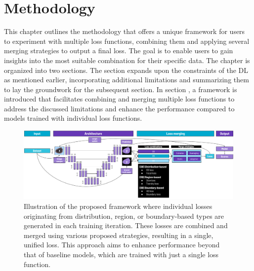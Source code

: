 \chapter{Methodology}
\label{chap:methodology}
This chapter outlines the methodology that offers a unique framework for users to experiment with multiple loss functions, combining them and applying several merging strategies to output a final loss. The goal is to enable users to gain insights into the most suitable combination for their specific data. The chapter is organized into two sections. The  section expands upon the constraints of the \acf{DL} as mentioned earlier, incorporating additional limitations and summarizing them to lay the groundwork for the subsequent section. In section , a framework is introduced that facilitates combining and merging multiple loss functions to address the discussed limitations and enhance the performance compared to models trained with individual loss functions.

\begin{figure}[H]%
  \centering
  \includegraphics[width=\imgWidthXL]{images/Pipeline_white_bg.png}
  \caption[Proposed segmentation framework]{Illustration of the proposed framework where individual losses originating from distribution, region, or boundary-based types are generated in each training iteration. These losses are combined and merged using various proposed strategies, resulting in a single, unified loss. This approach aims to enhance performance beyond that of baseline models, which are trained with just a single loss function.}
  \label{framework}
\end{figure}

